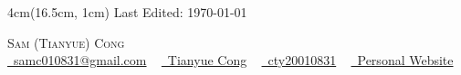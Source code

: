 \documentclass{resume} %
\begin{document}
\begin{textblock*}{4cm}(16.5cm, 1cm)
    \small Last Edited: \mydate\today
\end{textblock*}

\begin{center}
    {\Huge \scshape{Sam (Tianyue) Cong}} \\ \vspace{9pt}
    \small
    \href{samc010831@gmail.com}{\faEnvelope\ samc010831@gmail.com} ~ 
    \href{https://www.linkedin.com/in/tianyue-cong-94969921b/}{\faLinkedin\ Tianyue Cong}  ~
    \href{https://github.com/cty20010831}{\faGithub\ cty20010831} ~
    \href{https://cty20010831.github.io/personal_site}{\faGlobe\ Personal Website}
    \vspace{-5pt}
\end{center}
\end{document}
